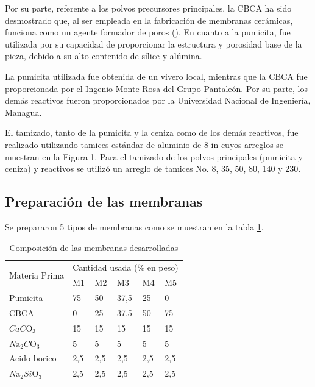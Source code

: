 \documentclass{article}
\begin{document}
Por su parte, referente a los polvos precursores principales, 
la CBCA ha sido desmostrado que, al ser empleada en la 
fabricación de membranas cerámicas, funciona como un agente 
formador de poros (\cite{Andrade2019}). En cuanto a la pumicita, fue 
utilizada por su capacidad de proporcionar la estructura y 
porosidad base de la pieza, debido a su alto contenido de 
sílice y alúmina.  

La pumicita utilizada fue obtenida de un vivero local, 
mientras que la CBCA fue proporcionada por el 
Ingenio Monte Rosa del Grupo Pantaleón. 
Por su parte, los demás reactivos fueron proporcionados por la 
Universidad Nacional de Ingeniería, Managua. 

El tamizado, tanto de la pumicita y la ceniza como de los demás 
reactivos, fue realizado utilizando tamices estándar de aluminio 
de 8 in cuyos arreglos se muestran en la Figura 1. 
Para el tamizado de los polvos principales (pumicita y ceniza) y 
reactivos se utilizó un arreglo de tamices 
No. 8, 35, 50, 80, 140 y 230. 

\subsection{Preparación de las membranas}

Se prepararon 5 tipos de membranas como se muestran en la tabla \ref{tab:Composicion Membranas}. 

\begin{table}[ht]
\caption{Composición de las membranas desarrolladas}
    \centering
    \begin{tabular}{p{3cm} p{2cm} p{2cm} p{2cm} p{2cm} p{2cm}}
         \toprule
        \multirow{2}{*}{Materia Prima} & \multicolumn{5}{c}{Cantidad usada (\% en peso)} \\
        \cline {2-6} 
        & M1 & M2 & M3 & M4 & M5 \\  
         \midrule
        Pumicita & 75 & 50 & 37,5 & 25 & 0 \\
        CBCA     &  0 & 25 & 37,5 & 50 & 75 \\
        $CaC\mathrm{O}_3$ & 15 & 15 & 15 & 15 & 15 \\
        $N\mathrm{a}_2C\mathrm{O}_3$ & 5 & 5 & 5 & 5 & 5 \\
        Acido borico     &  2,5 & 2,5 & 2,5 & 2,5 & 2,5 \\
        $N\mathrm{a}_2Si\mathrm{O}_3$ & 2,5 & 2,5 & 2,5 & 2,5 & 2,5 \\
         \bottomrule
    \end{tabular}
    \label{tab:Composicion Membranas}
\end{table}
\end{document}
